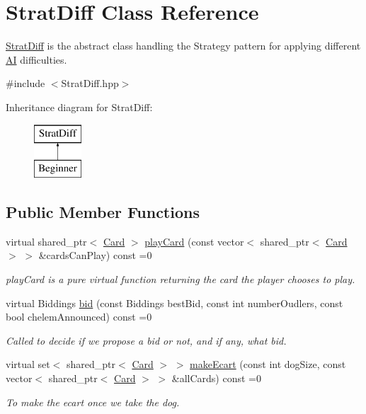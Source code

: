 \hypertarget{classStratDiff}{\section{Strat\-Diff Class Reference}
\label{classStratDiff}
}


\hyperlink{classStratDiff}{Strat\-Diff} is the abstract class handling the Strategy pattern for applying different \hyperlink{classAI}{A\-I} difficulties.  




{\ttfamily \#include $<$Strat\-Diff.\-hpp$>$}

Inheritance diagram for Strat\-Diff\-:\begin{figure}[H]
\begin{center}
\leavevmode
\includegraphics[height=2.000000cm]{classStratDiff}
\end{center}
\end{figure}
\subsection*{Public Member Functions}
\begin{DoxyCompactItemize}
\item 
virtual shared\-\_\-ptr$<$ \hyperlink{classCard}{Card} $>$ \hyperlink{classStratDiff_a550903bf95e6a897f346debab972f33a}{play\-Card} (const vector$<$ shared\-\_\-ptr$<$ \hyperlink{classCard}{Card} $>$ $>$ \&cards\-Can\-Play) const =0
\begin{DoxyCompactList}\small\item\em play\-Card is a pure virtual function returning the card the player chooses to play. \end{DoxyCompactList}\item 
virtual Biddings \hyperlink{classStratDiff_ac77eac57b96c445edeb36c7205cfbcf4}{bid} (const Biddings best\-Bid, const int number\-Oudlers, const bool chelem\-Announced) const =0
\begin{DoxyCompactList}\small\item\em Called to decide if we propose a bid or not, and if any, what bid. \end{DoxyCompactList}\item 
virtual set$<$ shared\-\_\-ptr$<$ \hyperlink{classCard}{Card} $>$ $>$ \hyperlink{classStratDiff_a892386aed17049a0d757170603fddce1}{make\-Ecart} (const int dog\-Size, const vector$<$ shared\-\_\-ptr$<$ \hyperlink{classCard}{Card} $>$ $>$ \&all\-Cards) const =0
\begin{DoxyCompactList}\small\item\em To make the ecart once we take the dog. \end{DoxyCompactList}\end{DoxyCompactItemize}


